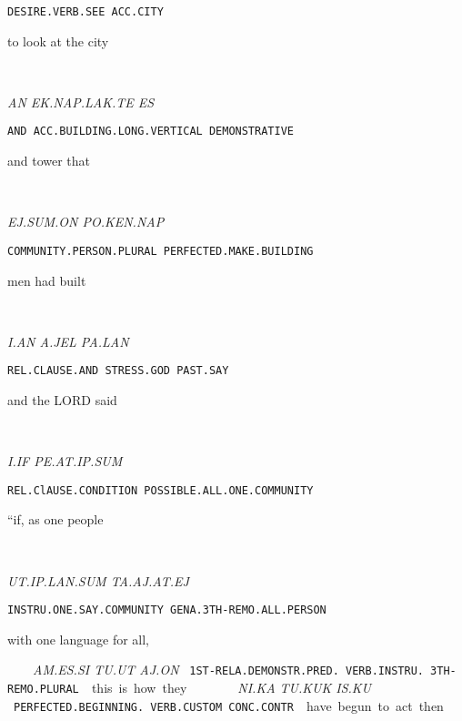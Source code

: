 {{\tt DESIRE.VERB.SEE	ACC.CITY }

to look			at the city 

\drie 
  
\an~\ek\nap\lak\te ~\es

{\it AN	EK.NAP.LAK.TE			ES			 }

{\tt AND	ACC.BUILDING.LONG.VERTICAL	DEMONSTRATIVE	 }

and 	tower 				that 			 

\drie 

\ej\Atlansum\on ~ \po\ken\nap

{\it EJ.SUM.ON			PO.KEN.NAP }

{\tt COMMUNITY.PERSON.PLURAL	PERFECTED.MAKE.BUILDING }

men				had built 

  
\drie 

\Atlani\an ~ \Atlana\jel~\pa\lan

{\it I.AN			A.JEL		PA.LAN }

{\tt REL.CLAUSE.AND              STRESS.GOD	PAST.SAY }

and 			the LORD            said 

\drie 

\Atlani\Atlanif~\pe\at\ip\Atlansum

{\it I.IF			PE.AT.IP.SUM				 }

{\tt REL.ClAUSE.CONDITION	POSSIBLE.ALL.ONE.COMMUNITY		 }

“if, 			as one people 		
\drie 


\ut\ip\lan\Atlansum~\ta\aj\at\ej\comma

{\it UT.IP.LAN.SUM			TA.AJ.AT.EJ }

{\tt INSTRU.ONE.SAY.COMMUNITY	GENA.3TH-REMO.ALL.PERSON	 }

with one language 		for all, 
\drie 

\am\es\si~\tu\ut~\aj\on
 
{\it AM.ES.SI			TU.UT		AJ.ON }

{\tt 1ST-RELA.DEMONSTR.PRED.	VERB.INSTRU.    3TH-REMO.PLURAL }

this is 				how       	they  
  
\drie 

\Atlanni\ka~\tu\kuk~\is\ku

{\it NI.KA				TU.KUK		IS.KU                    } 

{\tt PERFECTED.BEGINNING.                 VERB.CUSTOM	CONC.CONTR	 }

have begun 			to act		then 		 
\drie 


}
